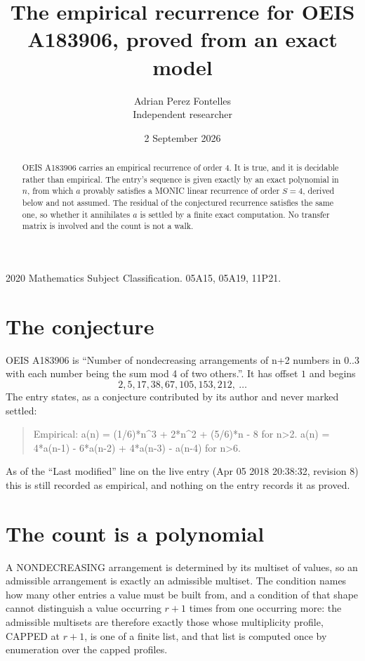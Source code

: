 \documentclass[11pt,a4paper]{article}
\title{The empirical recurrence for OEIS A183906, proved from an exact model}
\author{Adrian Perez Fontelles\\ \small Independent researcher}
\date{2 September 2026}
\theoremstyle{plain}
\theoremstyle{definition}
\begin{document}
\maketitle

\begin{abstract}
OEIS A183906 carries an empirical recurrence of order $4$. It is true, and it is
decidable rather than empirical. The entry's sequence is given exactly by an exact polynomial in $n$, from
which $a$ provably satisfies a MONIC linear recurrence of order $S=4$, derived below and not
assumed. The residual of the conjectured recurrence satisfies the same one, so whether it
annihilates $a$ is settled by a finite exact computation. No transfer matrix is involved and
the count is not a walk.
\end{abstract}

\noindent\small 2020 Mathematics Subject Classification. 05A15, 05A19, 11P21.\normalsize

\section{The conjecture}

OEIS A183906 is ``Number of nondecreasing arrangements of n+2 numbers in 0..3 with each number being the sum mod 4 of two others.''. It has offset $1$ and begins
\[
2, 5, 17, 38, 67, 105, 153, 212,\ \dots
\]
The entry states, as a conjecture contributed by its author and never marked settled:
\begin{quote}
Empirical: a(n) = (1/6)*n\^{}3 + 2*n\^{}2 + (5/6)*n - 8 for n>2. a(n) = 4*a(n-1) - 6*a(n-2) + 4*a(n-3) - a(n-4) for n>6.
\end{quote}
As of the ``Last modified'' line on the live entry (Apr 05 2018 20:38:32, revision 8)
this is still recorded as empirical, and nothing on the entry records it as proved.

\section{The count is a polynomial}

A NONDECREASING arrangement is determined by its multiset of values, so an admissible
arrangement is exactly an admissible multiset. The condition names how many other entries a
value must be built from, and a condition of that shape cannot distinguish a value occurring
$r+1$ times from one occurring more: the admissible multisets are therefore exactly those
whose multiplicity profile, CAPPED at $r+1$, is one of a finite list, and that list is computed
once by enumeration over the capped profiles.
\end{document}
